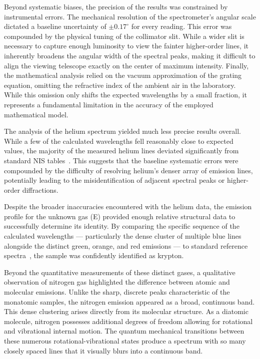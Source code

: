 \documentclass[11pt]{article}
\begin{document}
        Beyond systematic biases, the precision of the results was constrained
        by instrumental errors.
        The mechanical resolution of the spectrometer's angular scale dictated
        a baseline uncertainty of \(\pm 0.17^\circ\) for every reading.
        This error was compounded by the physical tuning of the collimator
        slit.
        While a wider slit is necessary to capture enough luminosity to view
        the fainter higher-order lines, it inherently broadens the angular
        width of the spectral peaks, making it difficult to align the viewing
        telescope exactly on the center of maximum intensity.
        Finally, the mathematical analysis relied on the vacuum approximation
        of the grating equation, omitting the refractive index of the ambient
        air in the laboratory.
        While this omission only shifts the expected wavelengths by a small
        fraction, it represents a fundamental limitation in the accuracy of
        the employed mathematical model.

        The analysis of the helium spectrum yielded much less precise results
        overall.
        While a few of the calculated wavelengths fell reasonably close to
        expected values, the majority of the measured helium lines deviated
        significantly from standard NIS tables~\cite{nist_helium}.
        This suggests that the baseline systematic errors were compounded by
        the difficulty of resolving helium's denser array of emission lines,
        potentially leading to the misidentification of adjacent
        spectral peaks or higher-order diffractions.

        Despite the broader inaccuracies encountered with the helium data, the
        emission profile for the unknown gas (E) provided enough relative
        structural data to successfully determine its identity.
        By comparing the specific sequence of the calculated wavelengths ---
        particularly the dense cluster of multiple blue lines alongside the
        distinct green, orange, and red emissions --- to standard reference
        spectra~\cite{nist_krypton}, the sample was confidently identified as
        krypton.

        Beyond the quantitative measurements of these distinct gases, a
        qualitative observation of nitrogen gas highlighted the difference
        between atomic and molecular emissions.
        Unlike the sharp, discrete peaks characteristic of the monatomic
        samples, the nitrogen emission appeared as a broad, continuous band.
        This dense clustering arises directly from its molecular structure.
        As a diatomic molecule, nitrogen possesses additional degrees of
        freedom allowing for rotational and vibrational internal motion.
        The quantum mechanical transitions between these numerous
        rotational-vibrational states produce a spectrum with so many closely
        spaced lines that it visually blurs into a continuous band.
\end{document}
